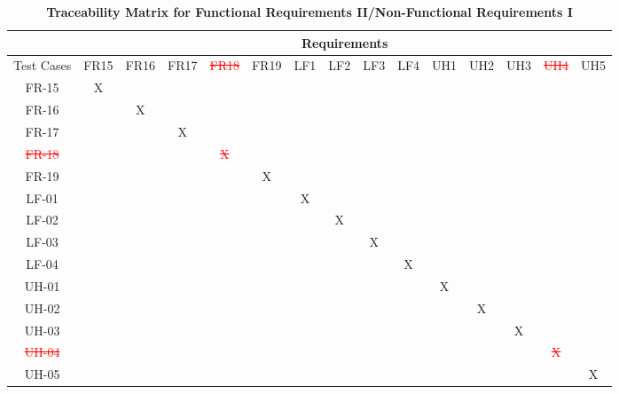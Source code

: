 \documentclass[12pt, titlepage]{article}
\begin{document}
\begin{landscape}
\begin{table}[h!]
\centering
\caption{\textbf{Traceability Matrix for Functional Requirements II/Non-Functional Requirements I}}
\label{tab:trace_matrix_02}
\begin{tabular}{|c|c|c|c|c|c|c|c|c|c|c|c|c|c|c|}
\hline
& \multicolumn{14}{c|}{Requirements} \\
\hline
Test Cases & FR15 & FR16 & FR17 & \textcolor{red}{\sout{FR18}} & FR19 & LF1 & LF2 & LF3 & LF4 & UH1 & UH2 & UH3 & \textcolor{red}{\sout{UH4}} & UH5 \\
\hline
FR-15 & X & & & & & & & & & & & & & \\
\hline
FR-16 & & X & & & & & & & & & & & & \\
\hline
FR-17 & & & X & & & & & & & & & & & \\
\hline
\textcolor{red}{\sout{FR-18}} & & & & \textcolor{red}{\sout{X}} & & & & & & & & & & \\
\hline
FR-19 & & & & & X & & & & & & & & & \\
\hline
LF-01 & & & & & & X & & & & & & & & \\
\hline
LF-02 & & & & & & & X & & & & & & & \\
\hline
LF-03 & & & & & & & & X & & & & & & \\
\hline
LF-04 & & & & & & & & & X & & & & & \\
\hline
UH-01 & & & & & & & & & & X & & & & \\
\hline
UH-02 & & & & & & & & & & & X & & & \\
\hline
UH-03 & & & & & & & & & & & & X & & \\
\hline
\textcolor{red}{\sout{UH-04}} & & & & & & & & & & & & & \textcolor{red}{\sout{X}} & \\
\hline
UH-05 & & & & & & & & & & & & & & X \\
\hline
\end{tabular}
\end{table}

\newpage


\end{landscape}
\end{document}
